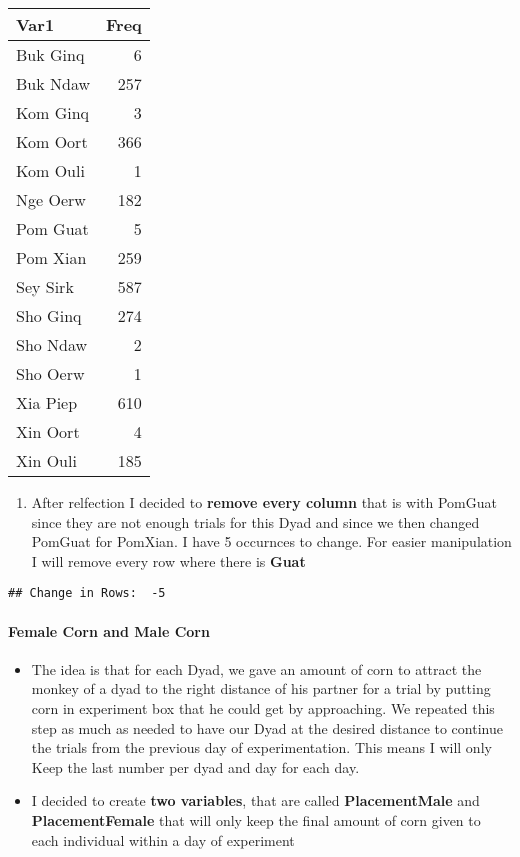 \documentclass[
]{article}
\providecommand{\tightlist}{%
  \setlength{\itemsep}{0pt}\setlength{\parskip}{0pt}}
\begin{document}
\begin{longtable}[]{@{}lr@{}}
\toprule
Var1 & Freq \\
\midrule
\endhead
Buk Ginq & 6 \\
Buk Ndaw & 257 \\
Kom Ginq & 3 \\
Kom Oort & 366 \\
Kom Ouli & 1 \\
Nge Oerw & 182 \\
Pom Guat & 5 \\
Pom Xian & 259 \\
Sey Sirk & 587 \\
Sho Ginq & 274 \\
Sho Ndaw & 2 \\
Sho Oerw & 1 \\
Xia Piep & 610 \\
Xin Oort & 4 \\
Xin Ouli & 185 \\
\bottomrule
\end{longtable}

\begin{enumerate}
\def\labelenumi{\arabic{enumi}.}
\setcounter{enumi}{4}
\tightlist
\item
  After relfection I decided to \textbf{remove every column} that is
  with PomGuat since they are not enough trials for this Dyad and since
  we then changed PomGuat for PomXian. I have 5 occurnces to change. For
  easier manipulation I will remove every row where there is
  \textbf{Guat}
\end{enumerate}

\begin{verbatim}
## Change in Rows:  -5
\end{verbatim}

\hypertarget{female-corn-and-male-corn}{%
\paragraph{Female Corn and Male Corn}\label{female-corn-and-male-corn}}

\begin{itemize}
\tightlist
\item
  The idea is that for each Dyad, we gave an amount of corn to attract
  the monkey of a dyad to the right distance of his partner for a trial
  by putting corn in experiment box that he could get by approaching. We
  repeated this step as much as needed to have our Dyad at the desired
  distance to continue the trials from the previous day of
  experimentation. This means I will only Keep the last number per dyad
  and day for each day.
\item
  I decided to create \textbf{two variables}, that are called
  \textbf{PlacementMale} and \textbf{PlacementFemale} that will only
  keep the final amount of corn given to each individual within a day of
  experiment
\end{itemize}
\end{document}

